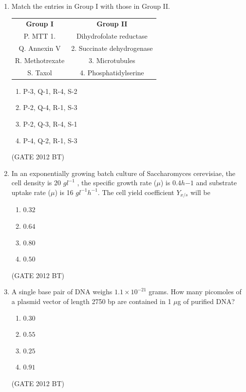 \documentclass[journal,12pt,onecolumn]{IEEEtran}
\theoremstyle{remark}
\begin{document}
\begin{enumerate}
\item 	Match the entries in Group I with those in Group II.\\
\begin{tabular}{c c}
\textbf{Group I}&	\textbf{Group II}\\
P.	MTT	1.& 	Dihydrofolate reductase\\
Q.	Annexin V&	2.	Succinate dehydrogenase\\
R.	Methotrexate&	3.	Microtubules\\
S.	Taxol&	4.	Phosphatidylserine
\end{tabular}
\begin{multicols}{4}
\begin{enumerate}
\item	P-3, Q-1, R-4, S-2
\item  P-2, Q-4, R-1, S-3
\item  P-2, Q-3, R-4, S-1
\item  P-4, Q-2, R-1, S-3
\end{enumerate}
\end{multicols} \hfill(GATE 2012 BT)


\item In an exponentially growing batch culture of Saccharomyces cerevisiae, the cell density is 20 $gl^{-1}$ , the specific growth rate ($\mu$) is $0.4 h{-1}$ and substrate uptake rate ($\mu$)  is 16 $gl^{-1}h^{-1}$. The cell yield coefficient $Y_{x/s}$ will be
\begin{multicols}{4}
\begin{enumerate}
\item $0.32$	
\item  $0.64$	
\item  $0.80$	
\item  $0.50$
\end{enumerate}
\end{multicols} \hfill(GATE 2012 BT)



\item 	A single base pair of DNA weighs $1.1 × 10^{-21}$ grams. How many picomoles of a plasmid vector of length 2750 bp are contained in 1 $\mu$g of purified DNA?
\begin{multicols}{4}
\begin{enumerate}
\item  $0.30$	
\item $0.55$
\item  $0.25$	
\item  $0.91$
\end{enumerate}
\end{multicols} \hfill(GATE 2012 BT)


\end{enumerate}
\end{document}
